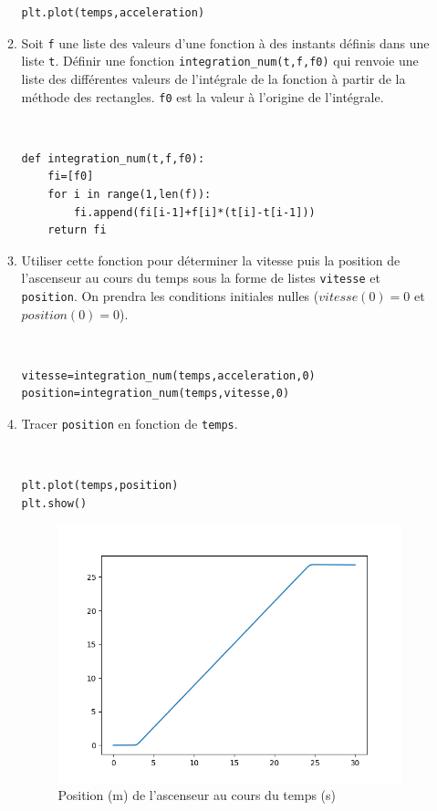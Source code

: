 \documentclass[a4paper,12pt]{article}
\begin{document}
\begin{enumerate}
\begin{enumerate}
\begin{solution}
\begin{verbatim}
plt.plot(temps,acceleration)
\end{verbatim}
\end{solution}
\item Soit \verb?f? une liste des valeurs d'une fonction à des instants définis dans une liste \verb?t?. Définir une fonction \verb?integration_num(t,f,f0)? qui renvoie une liste des différentes valeurs de l'intégrale de la fonction à partir de la méthode des rectangles. \verb?f0? est la valeur à l’origine de l'intégrale.
\begin{solution}~\ \\
\begin{verbatim}
def integration_num(t,f,f0):
    fi=[f0]
    for i in range(1,len(f)):
        fi.append(fi[i-1]+f[i]*(t[i]-t[i-1]))
    return fi
\end{verbatim}
\end{solution}
\item Utiliser cette fonction pour déterminer la vitesse puis la position de l'ascenseur au cours du temps sous la forme de listes \verb?vitesse? et \verb?position?. On prendra les conditions initiales nulles ($vitesse(0)=0$ et $position(0)=0$).
\begin{solution}~\ \\
\begin{verbatim}
vitesse=integration_num(temps,acceleration,0)
position=integration_num(temps,vitesse,0)
\end{verbatim}
\end{solution}
\item Tracer \verb?position? en fonction de \verb?temps?.
\begin{solution}~\ \\
\begin{verbatim}
plt.plot(temps,position)
plt.show()
\end{verbatim}
\begin{figure}[!ht]
 \begin{center}
 \includegraphics[width=0.5\linewidth]{Code/figure2}
 \caption{Position (m) de l'ascenseur au cours du temps (s)}

\end{center}
\end{figure}
\end{solution}
\end{enumerate}
\end{enumerate}
\end{document}
